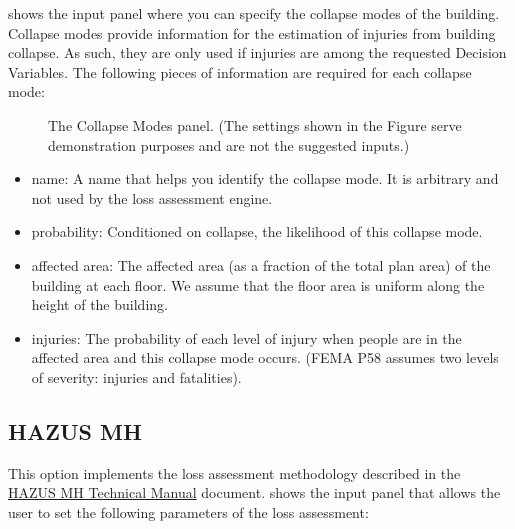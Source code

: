  shows the input panel where you can specify the collapse modes of the building. Collapse modes provide information for the estimation of injuries from building collapse. As such, they are only used if injuries are among the requested Decision Variables. The following pieces of information are required for each collapse mode:

\begin{figure}[!htbp]
  \caption{The Collapse Modes panel. (The settings shown in the Figure serve demonstration purposes and are not the suggested inputs.)}
  \label{fig:dl_p58_collmod}
\end{figure}

\begin{itemize}
    \item name: A name that helps you identify the collapse mode. It is arbitrary and not used by the loss assessment engine.
    \item probability: Conditioned on collapse, the likelihood of this collapse mode.
    \item affected area: The affected area (as a fraction of the total plan area) of the building at each floor. We assume that the floor area is uniform along the height of the building.
    \item injuries: The probability of each level of injury when people are in the affected area and this collapse mode occurs. (FEMA P58 assumes two levels of severity: injuries and fatalities).
\end{itemize}

\subsection{HAZUS MH}

This option implements the loss assessment methodology described in the \href{https://www.fema.gov/media-library-data/20130726-1820-25045-6286/hzmh2_1_eq_tm.pdf}{HAZUS MH Technical Manual} document.  shows the input panel that allows the user to set the following parameters of the loss assessment:

